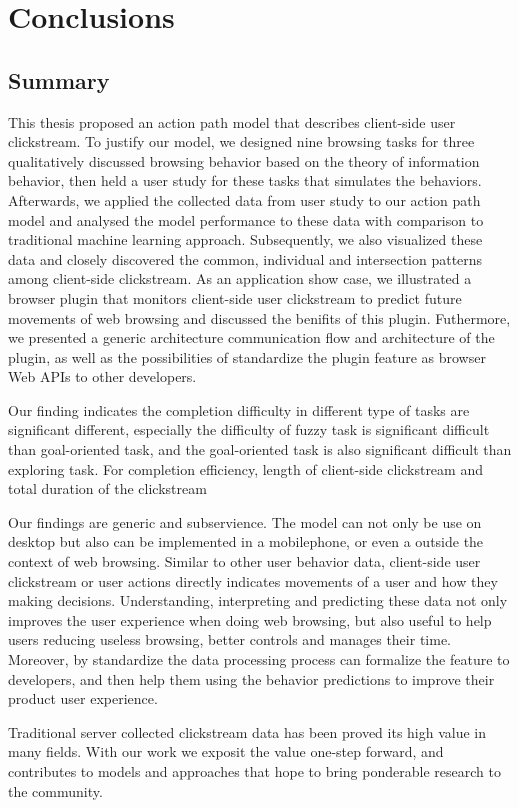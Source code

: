 \section{Conclusions}
\label{ch:final}

\subsection{Summary}


This thesis proposed an action path model that describes client-side user clickstream.
To justify our model, we designed nine browsing tasks for three qualitatively
discussed browsing behavior based on the theory of information behavior, then 
held a user study for these tasks that simulates the behaviors. 
Afterwards, we applied the collected data from user study to our action path model and
analysed the model performance to these data with comparison to traditional machine 
learning approach.
Subsequently, we also visualized these data and closely discovered the common, 
individual and intersection patterns among client-side clickstream.
As an application show case, we illustrated a browser plugin that monitors client-side 
user clickstream to predict future movements of web browsing and discussed the benifits of this plugin.
Futhermore, we presented a generic architecture communication flow and architecture of the plugin, 
as well as the possibilities of standardize the plugin feature as browser Web APIs to other developers.


Our finding indicates the completion difficulty in different type of tasks are significant different,
especially the difficulty of fuzzy task is significant difficult than goal-oriented task,
and the goal-oriented task is also significant difficult than exploring task.
For completion efficiency, length of client-side clickstream and total duration of the clickstream

Our findings are generic and subservience. The model can not only be use on desktop but
also can be implemented in a mobilephone, or even a outside the context of web browsing. 
Similar to other user behavior data, client-side user clickstream or user actions 
directly indicates movements of a user and how they making decisions. Understanding, 
interpreting and predicting these data not only improves the user experience when doing
web browsing, but also useful to help users reducing useless browsing, better controls 
and manages their time. Moreover, by standardize the data processing process can formalize
the feature to developers, and then help them using the behavior predictions to
improve their product user experience.

Traditional server collected clickstream data has been proved its high value in many fields. With our work we exposit the value one-step forward, and contributes to models and approaches that hope to bring ponderable research to the community.


\cleardoublepage